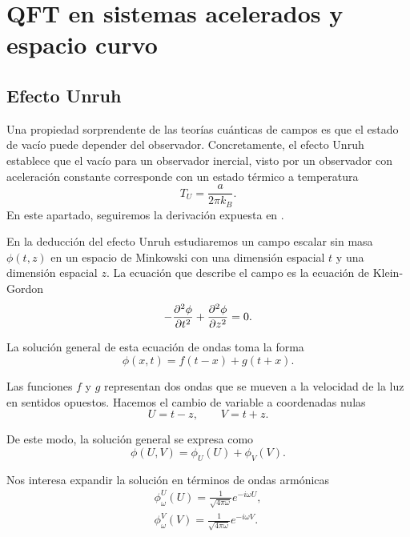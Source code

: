 \chapter{QFT en sistemas acelerados y espacio curvo}

\section{Efecto Unruh}

Una propiedad sorprendente de las teorías cuánticas de campos es que el estado de vacío
puede depender del observador.
Concretamente, el efecto Unruh establece que el vacío para un observador inercial,
visto por un observador con aceleración constante corresponde con un estado térmico a temperatura
\begin{equation}
  T_U=\frac{a}{2\pi k_B}.
\end{equation}
En este apartado, seguiremos la derivación expuesta en \cite{Barbado:2015uua}.

En la deducción del efecto Unruh estudiaremos un campo escalar sin masa $\phi(t,z)$ en un espacio de Minkowski
con una dimensión espacial $t$ y una dimensión espacial $z$.  
La ecuación que describe el campo es la ecuación de Klein-Gordon
\begin{equation}
  -\pdv[2]{\phi}{t}+\pdv[2]{\phi}{z}=0.
  \label{eq:kg}
\end{equation}

La solución general de esta ecuación de ondas toma la forma
\begin{equation}
  \phi(x,t)=f(t-x)+g(t+x).
\end{equation}

Las funciones $f$ y $g$ representan dos ondas que se mueven a la velocidad de la luz en sentidos
opuestos. 
Hacemos el cambio de variable a coordenadas nulas
\begin{equation}
  U=t-z,   \qquad V=t+z.
\end{equation}

De este modo, la solución general se expresa como
\begin{equation}
  \phi(U,V)=\phi_U(U)+\phi_V(V).
\end{equation}

Nos interesa expandir la solución en términos de ondas armónicas
\begin{gather}
  \phi_\omega^U(U)=\frac{1}{\sqrt{4\pi\omega}} e^{-i\omega U},  \\
  \phi_\omega^V(V)=\frac{1}{\sqrt{4\pi\omega}} e^{-i\omega V}.
\end{gather}

